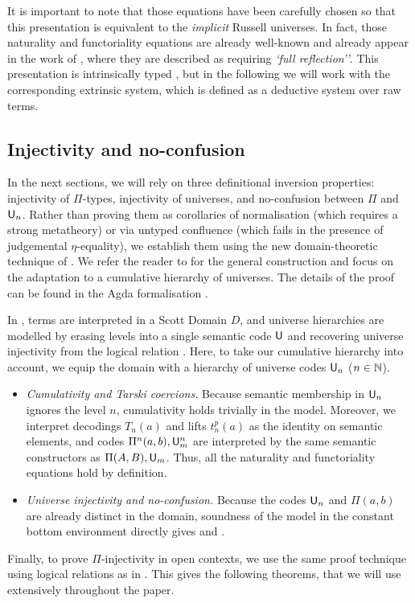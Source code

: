 It is important to note that those equations have been carefully chosen so that this presentation is equivalent to the \textit{implicit} Russell universes. In fact, those naturality and functoriality equations are already well-known and already appear in the work of \citet{assaf, thire}, where they are described as requiring \textit{`full reflection''}. This presentation is intrinsically typed \cite{CWF-CCD,QIIT}, but in the following we will work with the corresponding extrinsic system, which is defined as a deductive system over raw terms. 

\subsection{Injectivity and no-confusion}

In the next sections, we will rely on three definitional inversion properties: injectivity of $\Pi$-types, injectivity of universes, and no-confusion between $\Pi$ and $\mathsf{U}_n$. 
Rather than proving them as corollaries of normalisation (which requires a strong metatheory) or via untyped confluence (which fails in the presence of judgemental $\eta$-equality), we establish them using the new domain-theoretic technique of \citet{definitional-inv}. 
We refer the reader to \citet[Section 2]{definitional-inv} for the general construction and focus on the adaptation to a cumulative hierarchy of universes. The details of the proof can be found in the Agda formalisation \cite{auto-formalisation}.

In \citet{definitional-inv}, terms are interpreted in a Scott Domain $D$, and universe hierarchies are modelled  by erasing levels into a single semantic code $\mathsf{U}$ and recovering universe injectivity from the logical relation \cite[Section 3]{definitional-inv}. Here, to take our cumulative hierarchy into account, we equip the domain with a hierarchy of universe codes $\mathsf{U}_n$ ($n \in \mathbb{N}$).
\begin{itemize}
    \item \textit{Cumulativity and Tarski coercions.} Because semantic membership in $\mathsf{U}_n$ ignores the level $n$, cumulativity holds trivially in the model. Moreover, we interpret decodings $T_n(a)$ and lifts $t_n^p(a)$ as the identity on semantic elements, and codes $\Pi^n(a,b), \mathsf{U}_m^n$ are interpreted by the same semantic constructors as $\Pi(A,B), \mathsf{U}_m$. Thus, all the naturality and functoriality equations hold by definition.
    \item \textit{Universe injectivity and no-confusion.} Because the codes $\mathsf{U}_n$ and $\Pi(a,b)$ are already distinct in the domain, soundness of the model in the constant bottom environment directly gives  and .
\end{itemize}
Finally, to prove $\Pi$-injectivity in open contexts, we use the same proof technique using logical relations as in \citet[Section 2.6]{definitional-inv}. 
This gives the following theorems, that we will use extensively throughout the paper.

